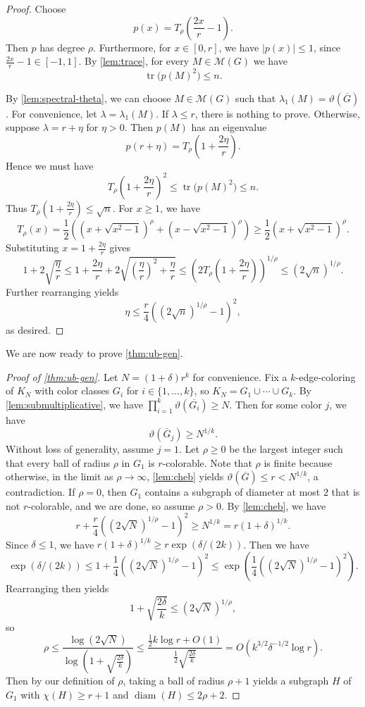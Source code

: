 \documentclass[reqno]{amsart}
\theoremstyle{remark}
\theoremstyle{definition}
\numberwithin{theorem}{section}
\renewcommand{\le}{\leqslant}
\renewcommand{\ge}{\geqslant}
\newcommand{\diam}{\operatorname{diam}}
\newcommand{\Tr}{\operatorname{tr}}
\newcommand{\ov}[1]{\overline{#1}}
\begin{document}
\begin{proof}
Choose
\[p(x)=T_\rho\left(\frac{2x}{r}-1\right).\]
Then $p$ has degree $\rho$. Furthermore, for $x\in[0,r]$, we have $|p(x)|\le 1$, since $\frac{2x}{r}-1\in[-1,1]$.
By \cref{lem:trace}, for every $M\in\mathcal M(G)$ we have
\[\Tr\bigl(p(M)^2\bigr)\le n.\]

By \cref{lem:spectral-theta}, we can choose $M\in\mathcal M(G)$ such that $\lambda_1(M)=\vartheta(\ov G)$. For convenience, let $\lambda=\lambda_1(M)$. If $\lambda\le r$, there is nothing to prove.  Otherwise, suppose $\lambda=r+\eta$ for $\eta > 0$. Then $p(M)$ has an eigenvalue
\[p(r+\eta)=T_\rho\left(1+\frac{2\eta}{r}\right).\]
Hence we must have
\[
T_\rho\left(1+\frac{2\eta}{r}\right)^2\le\Tr\bigl(p(M)^2\bigr)\le n.\]
Thus $T_\rho\left(1+\frac{2\eta}{r}\right)\le\sqrt{n}$.
For $x\ge 1$, we have 
\[T_\rho(x)=\frac{1}{2}\left(\left(x+\sqrt{x^2-1}\right)^\rho+\left(x-\sqrt{x^2-1}\right)^\rho\right)\ge \frac{1}{2}\left(x+\sqrt{x^2-1}\right)^\rho.\]
Substituting $x=1+\frac{2\eta}{r}$ gives
\[1+2\sqrt{\frac{\eta}{r}} \le 1+\frac{2\eta}{r}+2\sqrt{(\frac{\eta}{r})^2+\frac{\eta}{r}}\le \left(2T_\rho\left(1+\frac{2\eta}{r}\right)\right)^{1/\rho} \le(2\sqrt{n})^{1/\rho}.\]
Further rearranging yields
\[
\eta \le \frac{r}{4}((2\sqrt{n})^{1/\rho}-1)^2,
\]
as desired.
\end{proof}

We are now ready to prove \cref{thm:ub-gen}.

\begin{proof}[Proof of \cref{thm:ub-gen}]
Let $N=(1+\delta)r^k$ for convenience. Fix a $k$-edge-coloring of $K_N$ with color classes $G_i$ for $i\in \{1,\dots,k\}$, so $K_N=G_1\cup\cdots\cup G_k$. By \cref{lem:submultiplicative}, we have $\prod_{i=1}^k\vartheta(\ov{G_i})\ge N$. Then for some color $j$, we have
\[
\vartheta(\ov G_j)\ge N^{1/k}.
\]
Without loss of generality, assume $j=1$. Let $\rho\ge 0$ be the largest integer such that every ball of radius $\rho$ in $G_1$ is $r$-colorable. Note that $\rho$ is finite because otherwise, in the limit as $\rho\to \infty$, \cref{lem:cheb} yields $\vartheta(\ov G)\le r<N^{1/k}$, a contradiction. If $\rho=0$, then $G_1$ contains a subgraph of diameter at most $2$ that is not $r$-colorable, and we are done, so assume $\rho>0$. By \cref{lem:cheb}, we have
\[
r+\frac{r}{4}((2\sqrt{N})^{1/\rho}-1)^2 \ge N^{1/k}=r(1+\delta)^{1/k}.
\]
Since $\delta \le 1$, we have $r(1+\delta)^{1/k}\ge r \exp(\delta/(2k))$. Then we have
\[
\exp(\delta/(2k))\le 1+\frac{1}{4}((2\sqrt{N})^{1/\rho}-1)^2\le \exp(\frac{1}{4}((2\sqrt{N})^{1/\rho}-1)^2).
\]
Rearranging then yields
\[
1+\sqrt{\frac{2\delta}{k}}\le (2\sqrt{N})^{1/\rho},
\]
so
\[
\rho \le \frac{\log (2\sqrt{N})}{\log (1+\sqrt{\frac{2\delta}{k}})}\le \frac{\frac{1}{2} k\log r+O(1)}{\frac{1}{2}\sqrt{\frac{2\delta}{k}}}=O(k^{3/2}\delta^{-1/2}\log r).
\]
Then by our definition of $\rho$, taking a ball of radius $\rho+1$ yields a subgraph $H$ of $G_1$ with $\chi(H)\ge r+1$ and  $\diam(H)\le 2\rho+2$.
\end{proof}
\end{document}
